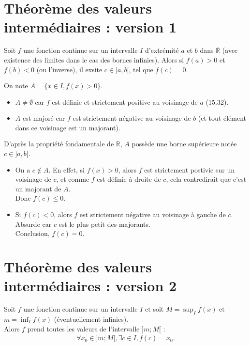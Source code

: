 \documentclass[../main.tex]{subfiles}
\begin{document}
\setcounter{section}{58}
\section{Théorème des valeurs intermédiaires : version 1}
\begin{tcolorbox}[title=Théorème 15.59, title filled=false, colframe=orange, colback=orange!10!white]
    Soit $f$ une fonction continue sur un intervalle $I$ d'extrémité $a$ et $b$ dans $\overline{\mathbb{R}}$ (avec existence des limites dans le cas des bornes infinies). Alors si $f(a) > 0$ et $f(b) < 0$ (ou l'inverse), il exsite $c \in ]a, b[$, tel que $f(c) = 0$. 
\end{tcolorbox}

On note $A = \{ x\in I, f(x) > 0 \}$. \\
\begin{itemize}
    \item $A \neq \emptyset$ car $f$ est définie et strictement positive au voisinage de $a$ (15.32). 
    \item $A$ est majoré car $f$ est strictement négative au voisinage de $b$ (et tout élément dans ce voisinage est un majorant). 
\end{itemize}
D'après la propriété fondamentale de $\mathbb{R}$, $A$ possède une borne supérieure notée $c \in ]a, b[$. 
\begin{itemize}
    \item On a $c \not \in A$. En effet, si $f(x) > 0$, alors $f$ est strictement postivie sur un voisinage de $c$, et comme $f$ est définie à droite de $c$, cela contredirait que c'est un majorant de $A$. \\
    Donc $f(c) \leq 0$. 
    \item Si $f(c) < 0$, alors $f$ est strictement négative au voisinage à gauche de $c$. \\
    Absurde car $c$ est le plus petit des majorants. \\
    Conclusion, $\boxed{f(c) = 0}$. 
\end{itemize}

\section{Théorème des valeurs intermédiaires : version 2}
\begin{tcolorbox}[title=Théorème 15.60, title filled=false, colframe=orange, colback=orange!10!white]
    Soit $f$ une fonction continue sur un intervalle $I$ et soit $M = \sup_I f(x)$ et $m = \inf_I f(x)$ (éventuellement infinies). \\
    Alors $f$ prend toutes les valeurs de l'intervalle $]m; M[$ :
    \begin{align*}
        \forall x_0\in ]m ; M[, \exists c \in I, f(c) = x_0. 
    \end{align*}
\end{tcolorbox}
\end{document}
